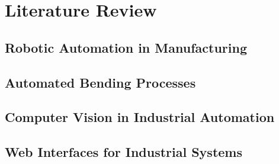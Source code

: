 \chapter{Literature Review}

\setcounter{section}{0}
\setcounter{subsection}{0}
\section{Robotic Automation in Manufacturing}


\section{Automated Bending Processes}


% 

\section{Computer Vision in Industrial Automation}


\section{Web Interfaces for Industrial Systems}
